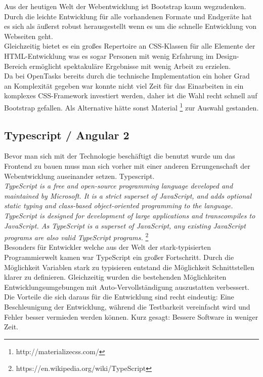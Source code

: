 Aus der heutigen Welt der Webentwicklung ist Bootstrap kaum wegzudenken. Durch die leichte Entwicklung für alle vorhandenen Formate und Endgeräte hat es sich als äußerst robust herausgestellt wenn es um die schnelle Entwicklung von Webseiten geht. \\
Gleichzeitig bietet es ein großes Repertoire an CSS-Klassen für alle Elemente der HTML-Entwicklung was es sogar Personen mit wenig Erfahrung im Design-Bereich ermöglicht spektakuläre Ergebnisse mit wenig Arbeit zu erzielen. \\

Da bei OpenTasks bereits durch die technische Implementation ein hoher Grad an Komplexität gegeben war konnte nicht viel Zeit für das Einarbeiten in ein komplexes CSS-Framework investiert werden, daher ist die Wahl recht schnell auf Bootstrap gefallen. Als Alternative hätte sonst Material \footnote{http://materializecss.com/} zur Auswahl gestanden. \\



\subsection{Typescript / Angular 2} \label{TS_NG2}

Bevor man sich mit der Technologie beschäftigt die benutzt wurde um das Frontend zu bauen muss man sich vorher mit einer anderen Errungenschaft der Webentwicklung auseinander setzen. Typescript. \\

\emph{\glqq   
TypeScript is a free and open-source programming language developed and maintained by Microsoft. It is a strict superset of JavaScript, and adds optional static typing and class-based object-oriented programming to the language. \\
TypeScript is designed for development of large applications and transcompiles to JavaScript. As TypeScript is a superset of JavaScript, any existing JavaScript programs are also valid TypeScript programs.
\grqq} \footnote{https://en.wikipedia.org/wiki/TypeScript} \\

Besonders für Entwickler welche aus der Welt der stark-typisierten Programmierwelt kamen war TypeScript ein großer Fortschritt. Durch die Möglichkeit Variablen stark zu typisieren entstand die Möglichkeit Schnittstellen klarer zu definieren. Gleichzeitig wurden die bestehenden Möglichkeiten Entwicklungsumgebungen mit Auto-Vervollständigung auszustatten verbessert. \\
Die Vorteile die sich daraus für die Entwicklung sind recht eindeutig: Eine Beschleunigung der Entwicklung, während die Testbarkeit vereinfacht wird und Fehler besser vermieden werden können. Kurz gesagt: Bessere Software in weniger Zeit. \\

